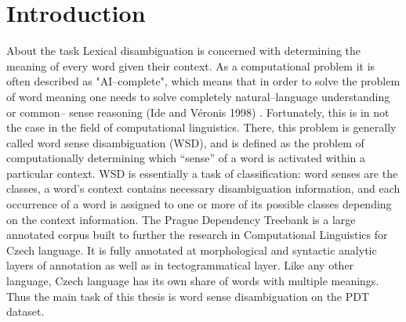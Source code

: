 \chapter{Introduction}

\begin{section}{About the task}
Lexical disambiguation is concerned with determining the meaning of every word given their context. As a computational problem it is often described as "AI--complete", which means that in order to solve the problem of word meaning one needs to solve completely  natural--language understanding or common-- sense reasoning (Ide and V\'eronis 1998)
. Fortunately, this is in not the case in the field of computational linguistics. There, this problem is generally called word sense disambiguation (WSD), and is defined as the problem of computationally determining which ``sense'' of a word is activated within a particular context. WSD is essentially a task of classification: word senses are the classes, a word's context contains necessary disambiguation information, and each occurrence of a word is assigned to one or more of its possible classes depending on the context information.
\newline
\newline The Prague Dependency Treebank is a large annotated corpus built to further the research in Computational Linguistics for Czech language. It is fully annotated at morphological and syntactic analytic  layers of annotation as well as in tectogrammatical layer. Like any other language, Czech language has its own share of words with multiple meanings. Thus the main task of this thesis is word sense disambiguation on the PDT dataset. 
\end{section}
